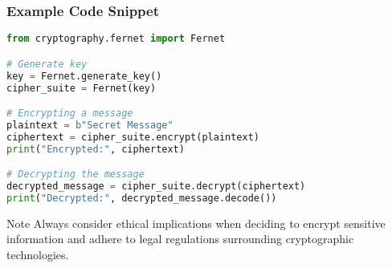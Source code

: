\documentclass{beamer}
\begin{document}
\begin{frame}[fragile]
    \frametitle{Example Code Snippet}
    \begin{lstlisting}[language=Python]
from cryptography.fernet import Fernet

# Generate key
key = Fernet.generate_key()
cipher_suite = Fernet(key)

# Encrypting a message
plaintext = b"Secret Message"
ciphertext = cipher_suite.encrypt(plaintext)
print("Encrypted:", ciphertext)

# Decrypting the message
decrypted_message = cipher_suite.decrypt(ciphertext)
print("Decrypted:", decrypted_message.decode())
    \end{lstlisting}
    
    \begin{block}{Note}
        Always consider ethical implications when deciding to encrypt sensitive information and adhere to legal regulations surrounding cryptographic technologies.
    \end{block}
\end{frame}
\end{document}
